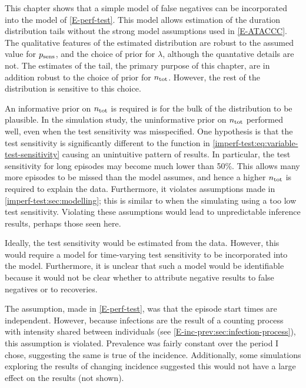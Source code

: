 \documentclass[thesis.tex]{subfiles}
\begin{document}
This chapter shows that a simple model of false negatives can be incorporated into the model of \cref{E-perf-test}.
This model allows estimation of the duration distribution tails without the strong model assumptions used in \cref{E-ATACCC}.
The qualitative features of the estimated distribution are robust to the assumed value for $p_\text{sens}$, and the choice of prior for $\lambda$, although the quantative details are not.
The estimates of the tail, the primary purpose of this chapter, are in addition robust to the choice of prior for $n_\text{tot}$.
However, the rest of the distribution is sensitive to this choice.

An informative prior on $n_\text{tot}$ is required is for the bulk of the distribution to be plausible.
In the simulation study, the uninformative prior on $n_\text{tot}$ performed well, even when the test sensitivity was misspecified.
One hypothesis is that the test sensitivity is significantly different to the function in \cref{imperf-test:eq:variable-test-sensitivity} causing an unintuitive pattern of results.
In particular, the test sensitivity for long episodes may become much lower than 50\%.
This allows many more episodes to be missed than the model assumes, and hence a higher $n_\text{tot}$ is required to explain the data.
Furthermore, it violates assumptions made in \cref{imperf-test:sec:modelling}; this is similar to when the simulating using a too low test sensitivity.
Violating these assumptions would lead to unpredictable inference results, perhaps those seen here.

Ideally, the test sensitivity would be estimated from the data.
However, this would require a model for time-varying test sensitivity to be incorporated into the model.
Furthermore, it is unclear that such a model would be identifiable because it would not be clear whether to attribute negative results to false negatives or to recoveries.

The assumption, made in \cref{E-perf-test}, was that the episode start times are independent.
However, because infections are the result of a counting process with intensity shared between individuals (see \cref{E-inc-prev:sec:infection-process}), this assumption is violated.
Prevalence was fairly constant over the period I chose, suggesting the same is true of the incidence.
Additionally, some simulations exploring the results of changing incidence suggested this would not have a large effect on the results (not shown).

\end{document}
